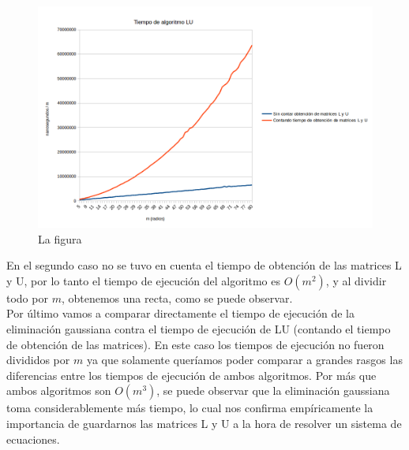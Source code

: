 \begin{figure}[h]
  \center
  \includegraphics[scale=0.6]{imagenes/tiempoLUdivididoM.png}
  \caption{La figura}
  \label{fig:ludivididom}
\end{figure}


En el segundo caso no se tuvo en cuenta el tiempo de obtención de las matrices L y U, por lo tanto el tiempo de ejecución del algoritmo es $O(m^{2})$, y al dividir todo por $m$, obtenemos una recta, como se puede observar. \\


Por último vamos a comparar directamente el tiempo de ejecución de la eliminación gaussiana contra el tiempo de ejecución de LU (contando el tiempo de obtención de las matrices). En este caso los tiempos de ejecución no fueron divididos por $m$ ya que solamente queríamos poder comparar a grandes rasgos las diferencias entre los tiempos de ejecución de ambos algoritmos. Por más que ambos algoritmos son $O(m^{3})$, se puede observar que la eliminación gaussiana toma considerablemente más tiempo, lo cual nos confirma empíricamente la importancia de guardarnos las matrices L y U a la hora de resolver un sistema de ecuaciones.

\newpage

